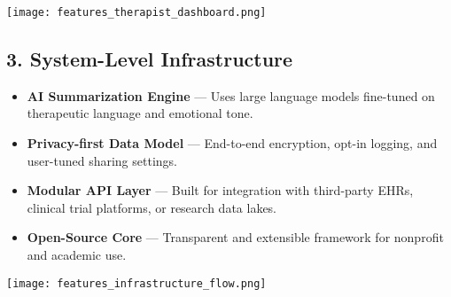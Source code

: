 \vspace{1em}
\begin{center}
  \texttt{[image: features\_therapist\_dashboard.png]}
\end{center}
\vspace{2em}

\subsection*{3. System-Level Infrastructure}

\begin{itemize}
  \item \textbf{AI Summarization Engine} — Uses large language models fine-tuned on therapeutic language and emotional tone.
  \item \textbf{Privacy-first Data Model} — End-to-end encryption, opt-in logging, and user-tuned sharing settings.
  \item \textbf{Modular API Layer} — Built for integration with third-party EHRs, clinical trial platforms, or research data lakes.
  \item \textbf{Open-Source Core} — Transparent and extensible framework for nonprofit and academic use.
\end{itemize}

\vspace{1em}
\begin{center}
  \texttt{[image: features\_infrastructure\_flow.png]}
\end{center}
